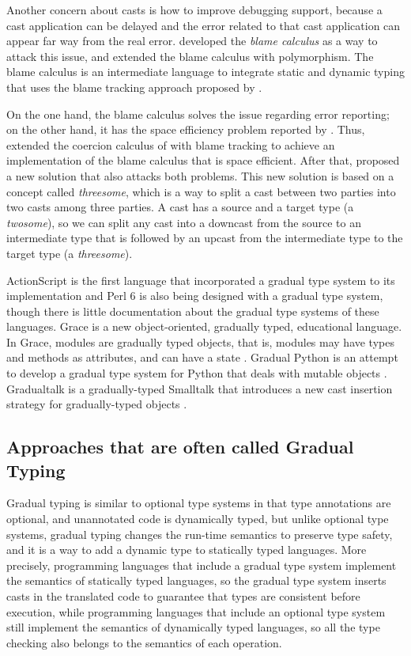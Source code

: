 \documentclass[preprint]{sig-alternate}
\begin{document}
Another concern about casts is how to improve debugging support,
because a cast application can be delayed and the error related
to that cast application can appear far way from the real error.
\citet{wadler2009wpc} developed the \textit{blame calculus} as a way
to attack this issue, and \citet{ahmed2011bfa} extended the
blame calculus with polymorphism.
The blame calculus is an intermediate language to integrate
static and dynamic typing that uses the blame tracking approach
proposed by \citet{findler2002chf}.

On the one hand, the blame calculus solves the issue regarding
error reporting;
on the other hand, it has the space efficiency problem reported
by \citet{herman2007sgt}.
Thus, \citet{siek2009casts} extended the coercion calculus of
\citet{herman2007sgt} with blame tracking to achieve an
implementation of the blame calculus that is space efficient.
After that, \citet{siek2010blame} proposed a new solution that also
attacks both problems.
This new solution is based on a concept called \textit{threesome},
which is a way to split a cast between two parties into two casts
among three parties.
A cast has a source and a target type (a \textit{twosome}),
so we can split any cast into a downcast from the source to an
intermediate type that is followed by an upcast from the intermediate
type to the target type (a \textit{threesome}).

ActionScript \citep{moock2007as3} is the first language that
incorporated a gradual type system to its implementation and
Perl 6 \citep{tang2007pri} is also being designed with a
gradual type system, though there is little documentation about
the gradual type systems of these languages.
Grace \citep{black2012grace,black2013sg} is a new object-oriented,
gradually typed, educational language.
In Grace, modules are gradually typed objects, that is, modules
may have types and methods as attributes, and can have a state
\citep{homer2013modules}.
Gradual Python \citep{reticulated} is an attempt to develop a
gradual type system for Python that deals with mutable objects
\citep{siek2013mutable}.
Gradualtalk \citep{allende2013gts} is a gradually-typed Smalltalk
that introduces a new cast insertion strategy for gradually-typed
objects \citep{allende2013cis}.

\subsection{Approaches that are often called Gradual Typing}

Gradual typing is similar to optional type systems in that type
annotations are optional, and unannotated code is dynamically
typed, but unlike optional type systems, gradual typing changes 
the run-time semantics to preserve type safety, and it is a way to
add a dynamic type to statically typed languages. 
More precisely, programming languages that include a gradual type
system implement the semantics of statically typed languages, so
the gradual type system inserts casts in the translated code to
guarantee that types are consistent before execution, while
programming languages that include an optional type system still
implement the semantics of dynamically typed languages, so all
the type checking also belongs to the semantics of each operation.
\end{document}
